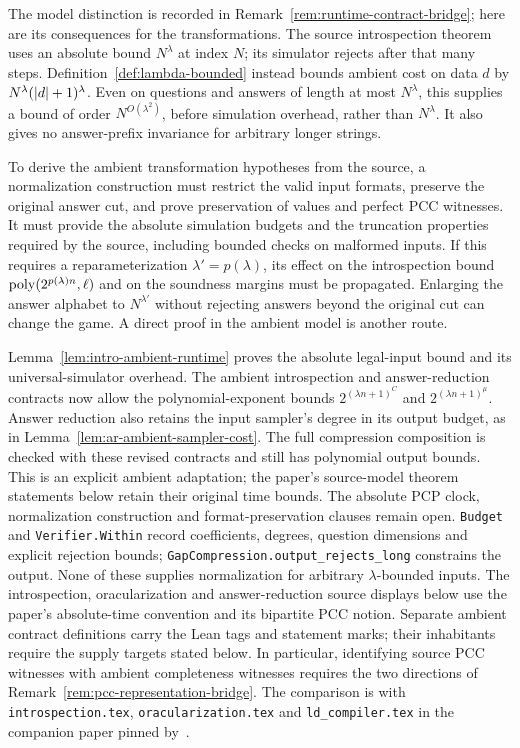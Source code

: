\begin{remark}
\label{rem:runtime-normalization}
The model distinction is recorded in Remark~\ref{rem:runtime-contract-bridge}; here
are its consequences for the transformations.
The source introspection theorem uses an absolute bound $N^\lambda$ at index $N$;
its simulator rejects after that many steps. Definition~\ref{def:lambda-bounded}
instead bounds ambient cost on data $d$ by $N^\lambda(\left\vert {d} \right\vert+1)^\lambda$.
Even on questions and answers of length at most $N^\lambda$, this supplies a bound
of order $N^{O(\lambda^2)}$, before simulation overhead, rather than $N^\lambda$.
It also gives no answer-prefix invariance for arbitrary longer strings.

To derive the ambient transformation hypotheses from the source, a normalization
construction must restrict the valid input formats, preserve the original answer cut,
and prove preservation of values and perfect PCC witnesses. It must provide the
absolute simulation budgets and the truncation properties required by the source,
including bounded checks on malformed inputs. If this requires a reparameterization
$\lambda' = p(\lambda)$, its effect on the introspection bound
$\mathrm{poly}(2^{p(\lambda)n},\ell)$ and on the soundness margins must be propagated.
Enlarging the answer alphabet to $N^{\lambda'}$ without rejecting answers beyond the
original cut can change the game. A direct proof in the ambient model is another route.

Lemma~\ref{lem:intro-ambient-runtime} proves the absolute legal-input bound and
its universal-simulator overhead. The ambient introspection and answer-reduction
contracts now allow the polynomial-exponent bounds $2^{(\lambda n+1)^C}$ and
$2^{(\lambda n+1)^\mu}$. Answer reduction also retains the input sampler's
degree in its output budget, as in Lemma~\ref{lem:ar-ambient-sampler-cost}.
The full compression composition is checked with these revised contracts and
still has polynomial output bounds. This is an explicit ambient adaptation;
the paper's source-model
theorem statements below retain their original time bounds.
The absolute PCP clock, normalization construction and format-preservation
clauses remain open.
\texttt{Budget} and \texttt{Verifier.Within} record coefficients, degrees, question
dimensions and explicit rejection bounds; \texttt{GapCompression.output\_rejects\_long}
constrains the output. None of these supplies normalization for arbitrary
$\lambda$-bounded inputs. The introspection, oracularization and answer-reduction
source displays below use the paper's absolute-time convention and its bipartite PCC
notion. Separate ambient contract definitions carry the Lean tags and statement marks;
their inhabitants require the supply targets stated below. In particular, identifying
source PCC witnesses with ambient completeness witnesses requires the two directions
of Remark~\ref{rem:pcc-representation-bridge}. The comparison is with \texttt{introspection.tex},
\texttt{oracularization.tex} and \texttt{ld\_compiler.tex} in the companion paper
pinned by~\cite{AuditSync26}.
\end{remark}



